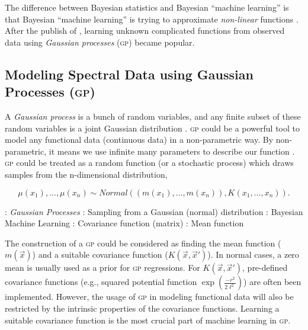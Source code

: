 \documentclass{ar-1col}
\begin{document}
The difference between Bayesian statistics and Bayesian ``machine learning'' is that Bayesian ``machine learning'' is trying to approximate {\it non-linear} functions \citep{Bishop2003}. 
After the publish of \citet{Rasmussen2005}, learning unknown complicated functions from observed data using {\it Gaussian processes} (\textsc{gp}) became popular. 

\subsection{Modeling Spectral Data using Gaussian Processes (\textsc{gp})}

A {\it Gaussian process} is a bunch of random variables, and any finite subset of these random variables is a joint Gaussian distribution \citep{Rasmussen2005}. \textsc{gp} could be a powerful tool to model any functional data (continuous data) in a non-parametric way. 
By non-parametric, it means we use infinite many parameters to describe our function \citep{Gelman04}. \textsc{gp} could be treated as a random function (or a stochastic process) which draws samples from the n-dimensional distribution, 

\begin{equation}
    \mu(x_1), ..., \mu(x_n) \sim Normal((m(x_1), ..., m(x_n)), K(x_1, ..., x_n)).
    \label{eq:GP}
\end{equation}

\begin{marginnote}[120pt]
    : \textit{Gaussian Processes}
    : Sampling from a Gaussian (normal) distribution
    : Bayesian Machine Learning    
    : Covariance function (matrix)
    \entry{$\mu$}: Mean function
\end{marginnote} 

The construction of a \textsc{gp} could be considered as finding the mean function ($m(\vec x)$) and a suitable covariance function ($K(\vec x, \vec x')$). 
In normal cases, a zero mean is usually used as a prior for \textsc{gp} regressions. For $K(\vec x, \vec x')$, pre-defined covariance functions (e.g., squared potential function $\exp{(\frac{-r^2}{2 \ell^2})}$) are often been implemented. 
However, the usage of \textsc{gp} in modeling functional data will also be restricted by the intrinsic properties of the covariance functions.
Learning a suitable covariance function is the most crucial part of machine learning in \textsc{gp}.
\end{document}
